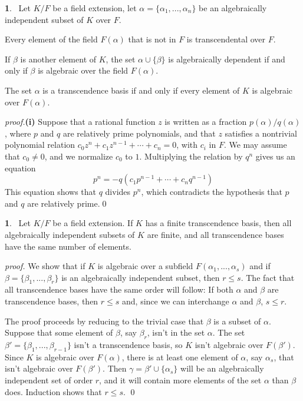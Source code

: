 \documentclass[leqno]{book}
\newcommand\Marginnote[1]{\marginnote{\hspace{-12pt}\normalfont{#1}}}
\theoremstyle{definition}%
\numberwithin{equation}{section}
\theoremstyle{theorem} %
\newtheorem{lemma}[equation]{}
\renewenvironment{proof}{\no \emph{proof.}}{}
\begin{document}
\begin{lemma}{}\Marginnote{algindtrivialities}\;\,
Let $K/F$ be a field extension, let $\alpha =
\{\alpha_1,...,\alpha_n\}$ be an algebraically independent subset of
$K$ over $F$.  

 Every element of the field $F(\alpha)$ that is not in $F$
is transcendental over $F$.


 If $\beta$ is another element of $K$, the
set $\alpha \cup \{\beta\}$ is algebraically dependent if
and only if $\beta$ is algebraic over the field $F(\alpha)$.

 The set $\alpha$ is a transcendence basis 
 if and only if every element of $K$ is algebraic over $F(\alpha)$.
\label{algindtrivialities}\end{lemma}

\begin{proof}{\bf (i)} 
Suppose that a rational function $z$ is written as a fraction
$p(\alpha)/q(\alpha)$, where $p$ and $q$ are relatively prime
polynomials, and that $z$ satisfies a nontrivial polynomial relation
$c_0z^n + c_1z^{n-1} + \cdots + c_n =0$, with $c_i$ in $F$.  We may
assume that $c_0 \neq 0$, and we normalize $c_0$ to $1$.  Multiplying
the relation by $q^n$ gives us an equation $$p^n = -q(c_1p^{n-1} +
\cdots + c_nq^{n-1})$$ This equation shows that $q$ divides $p^n$,
which contradicts the hypothesis that $p$ and $q$ are relatively
prime.\qed\end{proof}
 

\begin{lemma}{}\Marginnote{trdeg}\;\,
Let $K/F$ be a field extension.  If $K$ has a finite transcendence
basis, then all algebraically independent subsets of $K$ are finite,
and all transcendence bases have the same number of elements.
\label{trdeg} \end{lemma}

\begin{proof} We show that  if $K$ is algebraic over a
subfield $F(\alpha_1,...,\alpha_s)$ and if
$\beta=\{\beta_1,...,\beta_r\}$ is an algebraically independent
subset, then $r \leq s$.  The fact that all transcendence bases have
the same order will follow: If both $\alpha$ and $\beta$ are
transcendence bases, then $r\leq s$ and, since we can interchange
$\alpha$ and $\beta$, $s\leq r$.

The proof proceeds by reducing to the trivial case that $\beta$ is a
subset of $\alpha$.  
Suppose that some element of $\beta$, say
$\beta_r$, isn't in the set $\alpha$.  The set $\beta' =
\{\beta_1,...,\beta_{r-1}\}$ isn't a transcendence basis, so $K$ isn't
algebraic over $F(\beta')$.  Since $K$ is algebraic over $F(\alpha)$,
there is at least one element of $\alpha$, say $\alpha_s$, that isn't
algebraic over $F(\beta')$.  Then $\gamma = \beta'\cup \{\alpha_s\}$
will be an algebraically independent set of order $r$, and it will
contain more elements of the set $\alpha$ than $\beta$ does. Induction
shows that $r\leq s$. \qed\end{proof}
\end{document}
